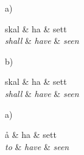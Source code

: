 \documentclass[10pt, a4paper]{article}
\let\w=\emph
\begin{document}
\begin{examples}
\item\label{ex:verb}
\begin{minipage}[t]{3cm}
a)
    \begin{dependency}
        \begin{deptext}[column sep=.2cm]
            skal \& ha \& sett \\
            \w{shall} \& \w{have} \& \w{seen}\\
        \end{deptext}
    \end{dependency}
\end{minipage}
\hspace{0.5cm}
\begin{minipage}[t]{3cm}
b)
    \begin{dependency}
        \begin{deptext}[column sep=.3cm]
            skal \& ha \& sett \\
            \w{shall} \& \w{have} \& \w{seen}\\
        \end{deptext}
    \end{dependency}
\end{minipage}
\item\label{ex:infmark}
\begin{minipage}[t]{3cm}
a)
    \begin{dependency}
        \begin{deptext}[column sep=.2cm]
            {\aa} \& ha \& sett \\
            \w{to} \& \w{have} \& \w{seen}\\
        \end{deptext}
    \end{dependency}

\end{minipage}
\end{examples}
\end{document}
